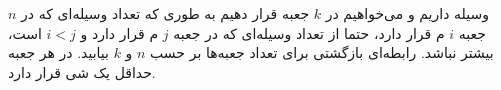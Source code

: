 \p
    $n$
    وسیله داریم و می‌خواهیم در 
    $k$
    جعبه قرار دهیم به طوری که تعداد وسیله‌ای که در جعبه
    $i$
    م
    قرار دارد، حتما از تعداد وسیله‌ای که در جعبه 
    $j$
    م
    قرار دارد و
    $i < j$
    است، بیشتر نباشد.
    رابطه‌ای بازگشتی برای تعداد جعبه‌ها بر حسب
    $n$
    و
    $k$
    بیابید.
    در هر جعبه حداقل یک شی قرار دارد.
